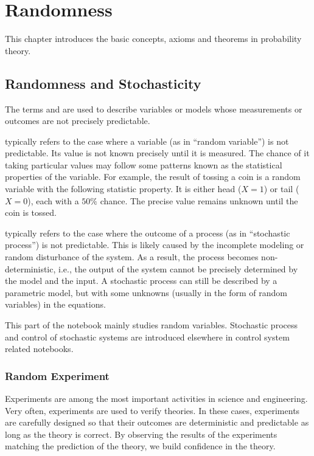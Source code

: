 \chapter{Randomness} \label{ch:pbbasics}

This chapter introduces the basic concepts, axioms and theorems in probability theory.

\section{Randomness and Stochasticity}

The terms  and  are used to describe variables or models whose measurements or outcomes are not precisely predictable.

 typically refers to the case where a variable (as in ``random variable'') is not predictable. Its value is not known precisely until it is measured. The chance of it taking particular values may follow some patterns known as the statistical properties of the variable. For example, the result of tossing a coin is a random variable with the following statistic property. It is either head ($X=1$) or tail ($X=0$), each with a $50\%$ chance. The precise value remains unknown until the coin is tossed.

 typically refers to the case where the outcome of a process (as in ``stochastic process'') is not predictable. This is likely caused by the incomplete modeling or random disturbance of the system. As a result, the process becomes non-deterministic, i.e., the output of the system cannot be precisely determined by the model and the input. A stochastic process can still be described by a parametric model, but with some unknowns (usually in the form of random variables) in the equations.

This part of the notebook mainly studies random variables. Stochastic process and control of stochastic systems are introduced elsewhere in control system related notebooks.

\subsection{Random Experiment}

Experiments are among the most important activities in science and engineering. Very often, experiments are used to verify theories. In these cases, experiments are carefully designed so that their outcomes are deterministic and predictable as long as the theory is correct. By observing the results of the experiments matching the prediction of the theory, we build confidence in the theory.


